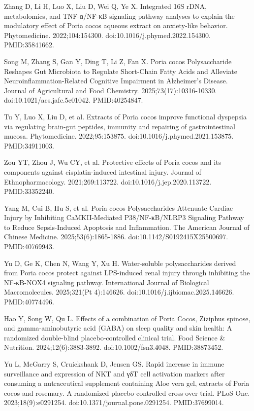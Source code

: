 \documentclass[12pt,oneside]{book}
\newcommand{\reff}[2]{\par\hangindent=7mm\hangafter=1\noindent[#1]\hspace{2mm}#2\par}
\begin{document}
\reff{27}{Zhang D, Li H, Luo X, Liu D, Wei Q, Ye X. Integrated 16S rDNA, metabolomics, and TNF-α/NF-κB signaling pathway analyses to explain the modulatory effect of Poria cocos aqueous extract on anxiety-like behavior. Phytomedicine. 2022;104:154300. doi:10.1016/j.phymed.2022.154300. PMID:35841662.}

\reff{28}{Song M, Zhang S, Gan Y, Ding T, Li Z, Fan X. Poria cocos Polysaccharide Reshapes Gut Microbiota to Regulate Short-Chain Fatty Acids and Alleviate Neuroinflammation-Related Cognitive Impairment in Alzheimer's Disease. Journal of Agricultural and Food Chemistry. 2025;73(17):10316-10330. doi:10.1021/acs.jafc.5c01042. PMID:40254847.}

\reff{29}{Tu Y, Luo X, Liu D, et al. Extracts of Poria cocos improve functional dyspepsia via regulating brain-gut peptides, immunity and repairing of gastrointestinal mucosa. Phytomedicine. 2022;95:153875. doi:10.1016/j.phymed.2021.153875. PMID:34911003.}

\reff{30}{Zou YT, Zhou J, Wu CY, et al. Protective effects of Poria cocos and its components against cisplatin-induced intestinal injury. Journal of Ethnopharmacology. 2021;269:113722. doi:10.1016/j.jep.2020.113722. PMID:33352240.}

\reff{31}{Yang M, Cui B, Hu S, et al. Poria cocos Polysaccharides Attenuate Cardiac Injury by Inhibiting CaMKII-Mediated P38/NF-κB/NLRP3 Signaling Pathway to Reduce Sepsis-Induced Apoptosis and Inflammation. The American Journal of Chinese Medicine. 2025;53(6):1865-1886. doi:10.1142/S0192415X25500697. PMID:40769943.}

\reff{32}{Yu D, Ge K, Chen N, Wang Y, Xu H. Water-soluble polysaccharides derived from Poria cocos protect against LPS-induced renal injury through inhibiting the NF-κB-NOX4 signaling pathway. International Journal of Biological Macromolecules. 2025;321(Pt 4):146626. doi:10.1016/j.ijbiomac.2025.146626. PMID:40774496.}

\reff{33}{Hao Y, Song W, Qu L. Effects of a combination of Poria Cocos, Ziziphus spinose, and gamma-aminobutyric acid (GABA) on sleep quality and skin health: A randomized double-blind placebo-controlled clinical trial. Food Science \& Nutrition. 2024;12(6):3883-3892. doi:10.1002/fsn3.4048. PMID:38873452.}

\reff{34}{Yu L, McGarry S, Cruickshank D, Jensen GS. Rapid increase in immune surveillance and expression of NKT and γδT cell activation markers after consuming a nutraceutical supplement containing Aloe vera gel, extracts of Poria cocos and rosemary. A randomized placebo-controlled cross-over trial. PLoS One. 2023;18(9):e0291254. doi:10.1371/journal.pone.0291254. PMID:37699014.}
\end{document}
